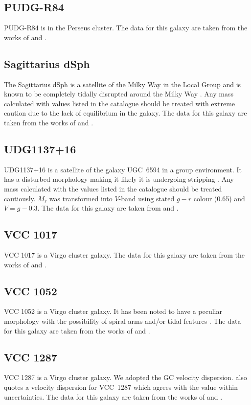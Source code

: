 \subsection{PUDG-R84}
PUDG-R84 is in the Perseus cluster. The data for this galaxy are taken from the works of \citet{Gannon2022} and \citet{FerreMateu2023}. 

\subsection{Sagittarius dSph}
The Sagittarius dSph is a satellite of the Milky Way in the Local Group and is known to be completely tidally disrupted around the Milky Way \citep{Ibata2001}. Any mass calculated with values listed in the catalogue should be treated with extreme caution due to the lack of equilibrium in the galaxy. The data for this galaxy are taken from the works of \citet{mcconnachie2012, Karachentsev2017} and \citet{Forbes2018}.

\subsection{UDG1137+16}
UDG1137+16 is a satellite of the galaxy UGC~6594 in a group environment. It has a disturbed morphology making it likely it is undergoing stripping \citep{Gannon2021}. Any mass calculated with the values listed in the catalogue should be treated cautiously. $M_r$ was transformed into $V$-band using stated $g-r$ colour (0.65) and $V=g-0.3$. The data for this galaxy are taken from \citet{Gannon2021} and \citet{FerreMateu2023}.

\subsection{VCC 1017}
VCC 1017 is a Virgo cluster galaxy. The data for this galaxy are taken from the works of \citet{Lim2020} and \citet{Toloba2023}.

\subsection{VCC 1052}
VCC 1052 is a Virgo cluster galaxy. It has been noted to have a peculiar morphology with the possibility of spiral arms and/or tidal features \citep{Lim2020}. The data for this galaxy are taken from the works of \citet{Lim2020} and \citet{Toloba2023}.

\subsection{VCC 1287}
VCC 1287 is a Virgo cluster galaxy. We adopted the \citet{Beasley2016} GC velocity dispersion. \citet{Toloba2023} also quotes a velocity dispersion for VCC~1287 which agrees with the \citet{Beasley2016} value within uncertainties. The data for this galaxy are taken from the works of \citet{Beasley2016, Gannon2020, Gannon2021} and \citet{Lim2020}.

